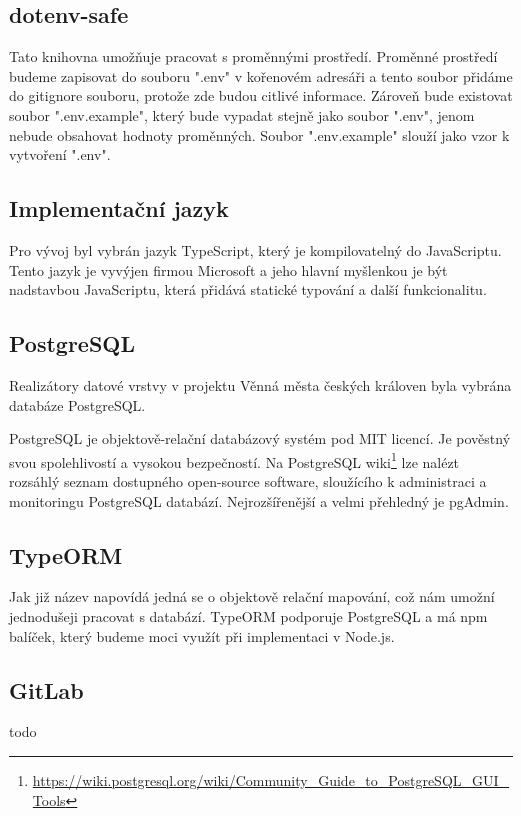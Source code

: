 \documentclass[thesis=B,czech]{FITthesis}[2012/06/26]
\begin{document}
        \subsection{dotenv-safe}
            Tato knihovna umožňuje pracovat s proměnnými prostředí. Proměnné prostředí budeme zapisovat do souboru ".env" v kořenovém adresáři a tento soubor přidáme do gitignore souboru, protože zde budou citlivé informace. Zároveň bude existovat soubor ".env.example", který bude vypadat stejně jako soubor ".env", jenom nebude obsahovat hodnoty proměnných. Soubor ".env.example" slouží jako vzor k vytvoření ".env". \cite{dotenv}
        \subsection{Implementační jazyk}
            Pro vývoj byl vybrán jazyk TypeScript, který je kompilovatelný do JavaScriptu. Tento jazyk je vyvýjen firmou Microsoft a jeho hlavní myšlenkou je být nadstavbou JavaScriptu, která přidává statické typování a další funkcionalitu.
        \subsection{PostgreSQL}
            Realizátory datové vrstvy v projektu Věnná města českých královen byla vybrána databáze PostgreSQL.
            
            PostgreSQL je objektově-relační databázový systém pod MIT licencí. Je pověstný svou spolehlivostí a vysokou bezpečností. Na PostgreSQL wiki\footnote{\url{https://wiki.postgresql.org/wiki/Community_Guide_to_PostgreSQL_GUI_Tools}} lze nalézt rozsáhlý seznam dostupného open-source software, sloužícího k administraci a monitoringu PostgreSQL databází. Nejrozšířenější a velmi přehledný je pgAdmin.
            \cite{postgres}
        \subsection{TypeORM}
            Jak již název napovídá jedná se o objektově relační mapování, což nám umožní jednodušeji pracovat s databází. TypeORM podporuje PostgreSQL a má npm balíček, který budeme moci využít při implementaci v Node.js.
            \cite{typeorm}
        \subsection{GitLab}
            todo
\end{document}
